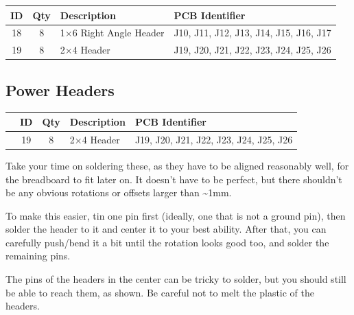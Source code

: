 \documentclass[12pt, a4paper]{article}
\newcommand{\checkbox}[1]{\CheckBox[backgroundcolor=0.86 0.828 0.71, name=#1]{}}
\begin{document}
\begin{center}
    \small
    \setlength\extrarowheight{4pt}
    \begin{tabularx}{\textwidth}{|c|c|X|l|}
        \hline \rowcolor{lightgray} ID & Qty & Description & PCB Identifier\\
        \hline 18 & 8 & 1×6 Right Angle Header & J10, J11, J12, J13, J14, J15, J16, J17\\
        \hline 19 & 8 & 2×4 Header & J19, J20, J21, J22, J23, J24, J25, J26\\
        \hline
    \end{tabularx}
\end{center}

\pagebreak

\subsection{Power Headers}

\begin{center}
    \small
    \setlength\extrarowheight{8pt}
    \begin{tabularx}{\textwidth}{|c|c|c|X|l|}
        \hline\rowcolor{lightgray} & ID & Qty & Description & PCB Identifier\\
        \hline\checkbox{fa} & 19 & 8 & 2×4 Header & J19, J20, J21, J22, J23, J24, J25, J26\\
        \hline
    \end{tabularx}
\end{center}

Take your time on soldering these, as they have to be aligned reasonably well, for the
breadboard to fit later on. It doesn't have to be perfect, but there shouldn't be any obvious
rotations or offsets larger than \textasciitilde1mm.

To make this easier, tin one pin first (ideally, one that is not a ground pin), then solder the
header to it and center it to your best ability. After that, you can carefully push/bend it a
bit until the rotation looks good too, and solder the remaining pins.

The pins of the headers in the center can be tricky to solder, but you should still be able to
reach them, as shown. Be careful not to melt the plastic of the headers.
\end{document}
